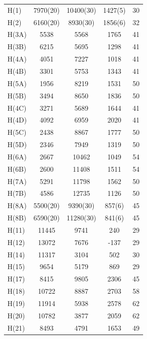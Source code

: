 \begin{center}
\tablelasttail{\bottomrule}
 {\footnotesize \singlespacing
\begin{supertabular}{lcccc}
H(1)&7970(20)&10400(30)&1427(5)&30\\
H(2)&6160(20)&8930(30)&1856(6)&32\\
H(3A)&5538&5568&1765&41\\
H(3B)&6215&5695&1298&41\\
H(4A)&4051&7227&1018&41\\
H(4B)&3301&5753&1343&41\\
H(5A)&1956&8219&1531&50\\
H(5B)&3494&8650&1836&50\\
H(4C)&3271&5689&1644&41\\
H(4D)&4092&6959&2020&41\\
H(5C)&2438&8867&1777&50\\
H(5D)&2346&7949&1319&50\\
H(6A)&2667&10462&1049&54\\
H(6B)&2600&11408&1511&54\\
H(7A)&5291&11798&1562&50\\
H(7B)&4586&12735&1126&50\\
H(8A)&5500(20)&9390(30)&857(6)&45\\
H(8B)&6590(20)&11280(30)&841(6)&45\\
H(11)&11445&9741&240&29\\
H(12)&13072&7676&-137&29\\
H(14)&11317&3104&502&30\\
H(15)&9654&5179&869&29\\
H(17)&8415&9805&2306&45\\
H(18)&10722&8887&2703&58\\
H(19)&11914&5938&2578&62\\
H(20)&10782&3877&2059&62\\
H(21)&8493&4791&1653&49\\
\end{supertabular}
}
\end{center}

